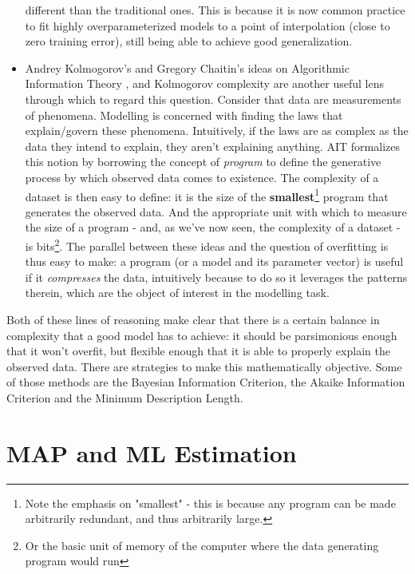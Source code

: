 \begin{itemize}
{        different than the traditional ones. This is because it is now common
        practice to fit highly overparameterized models to a point of interpolation
        (close to zero training error), still being able to achieve good generalization.}
    \item Andrey Kolmogorov's and Gregory Chaitin's ideas on Algorithmic Information
        Theory \cite{chaitin-leibniz}, and Kolmogorov complexity  are another
        useful lens through which to regard this question. Consider that data are
        measurements of phenomena. Modelling is concerned with finding the
        laws that explain/govern these phenomena. Intuitively, if the laws are
        as complex as the data they intend to explain, they aren't explaining anything.
        AIT formalizes this notion by borrowing the concept of \emph{program} to
        define the generative process by which observed data comes to existence.
        The complexity of a dataset is then easy to define: it is the size of
        the \textbf{smallest}\footnote{Note the emphasis on "smallest" - this is
        because any program can be made arbitrarily redundant, and thus arbitrarily large.}
        program that generates the observed data. And the appropriate unit with
        which to measure the size of a program - and, as we've now seen, the
        complexity of a dataset - is bits\footnote{Or the basic unit of memory
        of the computer where the data generating program would run}. The parallel
        between these ideas and the question of overfitting is thus easy to make:
        a program (or a model and its parameter vector)  is useful if it 
        \emph{compresses} the data, intuitively because to do so it leverages the
        patterns therein, which are the object of interest in the modelling task.
\end{itemize}

Both of these lines of reasoning make clear that there is a certain balance
in complexity that a good model has to achieve: it should be parsimonious enough
that it won't overfit, but flexible enough that it is able to properly explain
the observed data.  There are strategies to make this mathematically objective.
Some of those methods are the Bayesian Information Criterion, the Akaike
Information Criterion and the Minimum Description Length.

\section{MAP and ML Estimation}
\label{section:map-mle}


